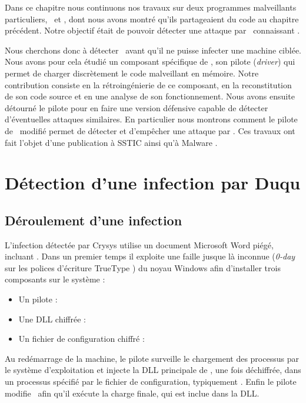 Dans ce chapitre nous continuons nos travaux sur deux programmes malveillants particuliers, \duqu\ et \stux, dont nous avons montré qu'ils partageaient du code au chapitre précédent.
Notre objectif était de pouvoir détecter une attaque par \duqu\ connaissant \stux.

Nous cherchons donc à détecter \duqu\ avant qu'il ne puisse infecter une machine ciblée.
Nous avons pour cela étudié un composant spécifique de \duqu, son pilote (\emph{driver}) qui permet de charger discrètement le code malveillant en mémoire.
Notre contribution consiste en la rétroingénierie de ce composant, en la reconstitution de son code source et en une analyse de son fonctionnement.
Nous avons ensuite détourné le pilote pour en faire une version défensive capable de détecter d'éventuelles attaques similaires.
En particulier nous montrons comment le pilote de \duqu\ modifié permet de détecter et d'empêcher une attaque par \duqu.
Ces travaux ont fait l'objet d'une publication à SSTIC \cite{sstic13} ainsi qu'à  Malware \cite{mal13}.

\section{Détection d'une infection par Duqu}
\subsection{Déroulement d'une infection}
L'infection détectée par Crysys utilise un document Microsoft Word piégé, incluant \duqu.
Dans un premier temps il exploite une faille jusque là inconnue (\emph{0-day} sur les polices d'écriture TrueType \cite{CVETrueType}) du noyau Windows afin d'installer trois composants sur le système :
\begin{itemize}
 \item Un pilote : \driver
 \item Une DLL chiffrée : \netpDLL
 \item Un fichier de configuration chiffré : \netpCONF
\end{itemize}

Au redémarrage de la machine, le pilote surveille le chargement des processus par le système d'exploitation et injecte la DLL principale de \duqu, une fois déchiffrée, dans un processus spécifié par le fichier de configuration, typiquement \services.
Enfin le pilote modifie \services\ afin qu'il exécute la charge finale, qui est inclue dans la DLL.

